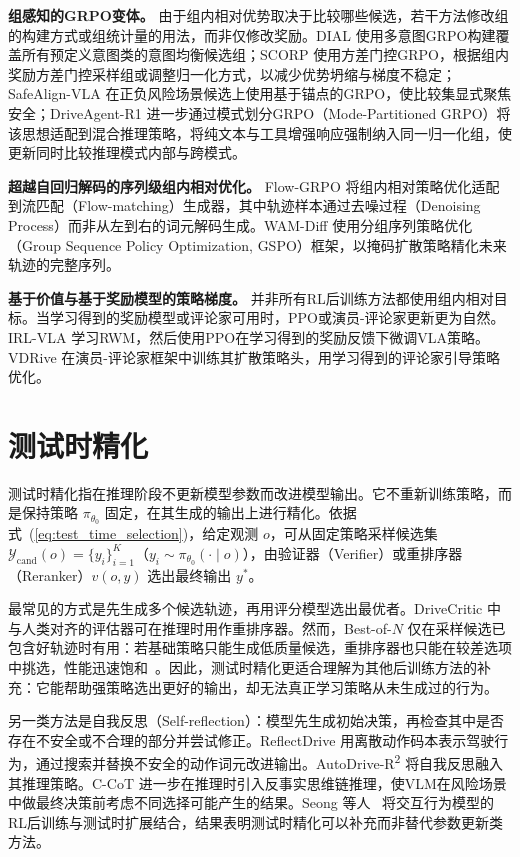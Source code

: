 \documentclass[runningheads]{llncs}
\begin{document}
\textbf{组感知的GRPO变体。}
由于组内相对优势取决于比较哪些候选，若干方法修改组的构建方式或组统计量的用法，而非仅修改奖励。DIAL \cite{dial2026} 使用多意图GRPO构建覆盖所有预定义意图类的意图均衡候选组；SCORP \cite{scorp2026} 使用方差门控GRPO，根据组内奖励方差门控采样组或调整归一化方式，以减少优势坍缩与梯度不稳定；SafeAlign-VLA \cite{safealignvla2026} 在正负风险场景候选上使用基于锚点的GRPO，使比较集显式聚焦安全；DriveAgent-R1 \cite{zheng2025driveagent} 进一步通过模式划分GRPO（Mode-Partitioned GRPO）将该思想适配到混合推理策略，将纯文本与工具增强响应强制纳入同一归一化组，使更新同时比较推理模式内部与跨模式。

\textbf{超越自回归解码的序列级组内相对优化。}
Flow-GRPO \cite{liu2026flow} 将组内相对策略优化适配到流匹配（Flow-matching）生成器，其中轨迹样本通过去噪过程（Denoising Process）而非从左到右的词元解码生成。WAM-Diff \cite{xu2025wam} 使用分组序列策略优化（Group Sequence Policy Optimization, GSPO）框架，以掩码扩散策略精化未来轨迹的完整序列。
 

\textbf{基于价值与基于奖励模型的策略梯度。}
并非所有RL后训练方法都使用组内相对目标。当学习得到的奖励模型或评论家可用时，PPO或演员-评论家更新更为自然。
IRL-VLA \cite{jiang2025irl} 学习RWM，然后使用PPO在学习得到的奖励反馈下微调VLA策略。VDRive \cite{vdrive2025} 在演员-评论家框架中训练其扩散策略头，用学习得到的评论家引导策略优化。


\section{测试时精化}
\label{sec:testtime}

测试时精化指在推理阶段不更新模型参数而改进模型输出。它不重新训练策略，而是保持策略 $\pi_{\theta_0}$ 固定，在其生成的输出上进行精化。依据式~(\ref{eq:test_time_selection})，给定观测 $o$，可从固定策略采样候选集 $\mathcal{Y}_{\mathrm{cand}}(o)=\{y_i\}_{i=1}^{K}$（$y_i\sim\pi_{\theta_0}(\cdot\mid o)$），由验证器（Verifier）或重排序器（Reranker）$v(o,y)$ 选出最终输出 $y^*$。



最常见的方式是先生成多个候选轨迹，再用评分模型选出最优者。DriveCritic \cite{drivecritic2025} 中与人类对齐的评估器可在推理时用作重排序器。然而，Best-of-$N$ 仅在采样候选已包含好轨迹时有用：若基础策略只能生成低质量候选，重排序器也只能在较差选项中挑选，性能迅速饱和~\cite{dial2026}。因此，测试时精化更适合理解为其他后训练方法的补充：它能帮助强策略选出更好的输出，却无法真正学习策略从未生成过的行为。


另一类方法是自我反思（Self-reflection）：模型先生成初始决策，再检查其中是否存在不安全或不合理的部分并尝试修正。ReflectDrive \cite{reflectdrive2025} 用离散动作码本表示驾驶行为，通过搜索并替换不安全的动作词元改进输出。AutoDrive-R\textsuperscript{2} \cite{autodriver2_2025} 将自我反思融入其推理策略。C-CoT \cite{ccot2026} 进一步在推理时引入反事实思维链推理，使VLM在风险场景中做最终决策前考虑不同选择可能产生的结果。Seong 等人~\cite{grbo2025} 将交互行为模型的RL后训练与测试时扩展结合，结果表明测试时精化可以补充而非替代参数更新类方法。
\end{document}
